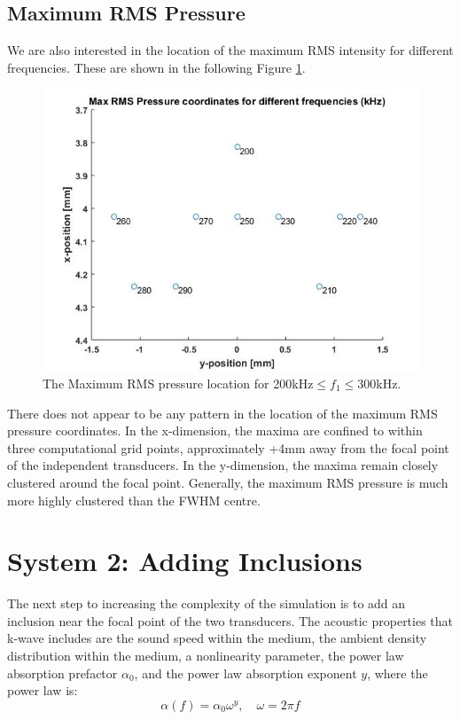 \documentclass[10pt,a4paper]{article}
\begin{document}
\subsection{Maximum RMS Pressure}

We are also interested in the location of the maximum RMS intensity for different frequencies. These are shown in the following Figure \ref{RMS_Max}. 

\begin{figure}[H] \label{RMS_Max}
\centering
\includegraphics[scale=0.65]{Max_RMS_pressure_coords}
\caption{The Maximum RMS pressure location for 200kHz$\leq f_1 \leq$300kHz.} 
\end{figure}

There does not appear to be any pattern in the location of the maximum RMS pressure coordinates. In the x-dimension, the maxima are confined to within three computational grid points, approximately +4mm away from the focal point of the independent transducers. In the y-dimension, the maxima remain closely clustered around the focal point. Generally, the maximum RMS pressure is much more highly clustered than the FWHM centre.

\section{System 2: Adding Inclusions}

The next step to increasing the complexity of the simulation is to add an inclusion near the focal point of the two transducers. The acoustic properties that k-wave includes are the sound speed within the medium, the ambient density distribution within the medium, a nonlinearity parameter, the power law absorption prefactor $\alpha_0$, and the power law absorption exponent $y$, where the power law is:
\begin{equation}
\alpha(f) = \alpha_0 \omega^y, 	\quad \omega = 2 \pi f 
\end{equation}
\end{document}
